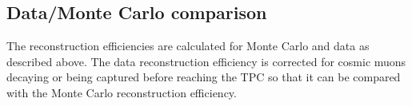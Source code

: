 \documentclass[a4paper,11pt]{article}
\begin{document}




\subsection{Data/Monte Carlo comparison}\label{sec:datamc}
The reconstruction efficiencies are calculated for Monte Carlo and data as described above. The data reconstruction efficiency is corrected for cosmic muons decaying or being captured before reaching the TPC so that it can be compared with the Monte Carlo reconstruction efficiency.
\end{document}
